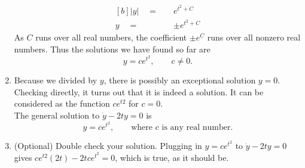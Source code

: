 \begin{enumerate}
\begin{equation*}
\begin{aligned}[b]
      |y| \quad = \quad &e^{t^2 + C} \\
      y \quad = \quad & \pm e^{t^2 + C}
    \end{aligned}
  \end{equation*}
  As $C$ runs over all real numbers, the coefficient $\pm e^C$ runs over all nonzero real numbers.
  Thus the solutions we have found so far are
  \begin{equation*}
    \displaystyle y = ce^{t^2}, \qquad c \neq 0. 
  \end{equation*}
\item Because we divided by $y$, there is possibly an exceptional solution $y =0$.
  Checking directly, it turns out that it is indeed a solution.
  It can be considered as the function $ce^{t2}$ for $c = 0$.\\

  \Conclusion The general solution to $\displaystyle \dot{y} - 2ty = 0$ is
  \begin{equation*}
    \displaystyle y = ce^{t^2}, \qquad \text{where c is any real number}.
  \end{equation*}
\item (Optional) Double check your solution. Plugging in
  $\displaystyle y = ce^{t^2}$ to
  $\displaystyle \dot{y} - 2ty = 0$
  gives $\displaystyle ce^{t2}(2t) - 2tce^{t^2} = 0$, which is true, as it should be.
\end{enumerate}

